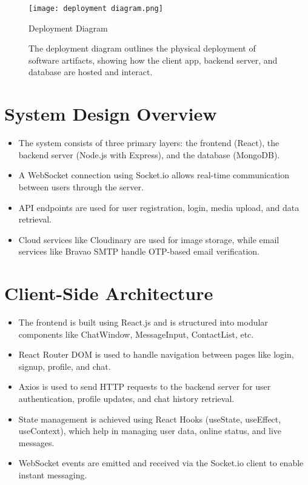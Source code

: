 \documentclass[12pt,a4paper]{report}
\begin{document}
\begin{figure}[H]
    \centering
    \texttt{[image: deployment diagram.png]}
    \caption{Deployment Diagram}
    \caption*{The deployment diagram outlines the physical deployment of software artifacts, showing how the client app, backend server, and database are hosted and interact.}
\end{figure}



\section{System Design Overview}
\begin{itemize}
    \item The system consists of three primary layers: the frontend (React), the backend server (Node.js with Express), and the database (MongoDB).
    \item A WebSocket connection using Socket.io allows real-time communication between users through the server.
    \item API endpoints are used for user registration, login, media upload, and data retrieval.
    \item Cloud services like Cloudinary are used for image storage, while email services like Bravao SMTP handle OTP-based email verification.
\end{itemize}

\section{Client-Side Architecture}
\begin{itemize}
    \item The frontend is built using React.js and is structured into modular components like ChatWindow, MessageInput, ContactList, etc.
    \item React Router DOM is used to handle navigation between pages like login, signup, profile, and chat.
    \item Axios is used to send HTTP requests to the backend server for user authentication, profile updates, and chat history retrieval.
    \item State management is achieved using React Hooks (useState, useEffect, useContext), which help in managing user data, online status, and live messages.
    \item WebSocket events are emitted and received via the Socket.io client to enable instant messaging.
\end{itemize}
\end{document}
